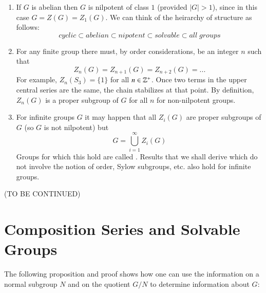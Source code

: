 \documentclass[12pt, a4paper, oneside, openright, titlepage]{book}
\begin{document}
\begin{rmk}
    \leavevmode
    \begin{enumerate}
        \item If $G$ is abelian then $G$ is nilpotent of class $1$ (provided $|G| > 1$), since in this case $G = Z(G) = Z_1(G)$. We can think of the heirarchy of structure as follows: \begin{equation*}
                cyclic\subset abelian \subset nipotent \subset solvable \subset all\;groups
        \end{equation*}
        \item For any finite group there must, by order considerations, be an integer $n$ such that \begin{equation*}
                Z_n(G) = Z_{n+1}(G) = Z_{n+2}(G) = ...
        \end{equation*}
            For example, $Z_n(S_3) = \{1\}$ for all $n \in \mathbb Z^+$. Once two terms in the upper central series  are the same, the chain stabilizes at that point. By definition, $Z_n(G)$ is a proper subgroup of $G$ for all $n$ for non-nilpotent groups.
        \item For infinite groups $G$ it may happen that all $Z_i(G)$ are proper subgroups of $G$ (so $G$ is not nilpotent) but \begin{equation*}
                G = \bigcup\limits_{i=1}^{\infty}Z_i(G)
        \end{equation*}
            Groups for which this hold are called . Results that we shall derive which do not involve the notion of order, Sylow subgroups, etc. also hold for infinite groups.
    \end{enumerate}
\end{rmk}

(TO BE CONTINUED)


\section{\textsection Composition Series and Solvable Groups}

The following proposition and proof shows how one can use the information on a normal subgroup $N$ and on the quotient $G/N$ to determine information about $G$:
\end{document}
